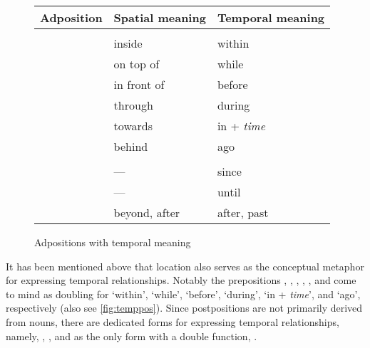 \begin{figure}[tp]\centering
\caption{Adpositions with temporal meaning}
\begin{tabu} to \linewidth {X X X}
\tableheaderfont\toprule
Adposition
	& Spatial meaning
	& Temporal meaning
	\\

\toprule

\tablesubheaderfont{} \\

\midrule

	& inside
	& within
	\\

	& on top of
	& while
	\\

	& in front of
	& before
	\\

	& through
	& during
	\\

	& towards
	& in + \textit{time}
	\\

	& behind
	& ago
	\\

\midrule

\tablesubheaderfont{} \\

\midrule

	& ---
	& since
	\\

	& ---
	& until
	\\

	& beyond, after
	& after, past
	\\

\bottomrule
\end{tabu}

\label{fig:temppos}
\end{figure}

It has been mentioned above that location also serves as the conceptual 
metaphor for expressing temporal relationships. Notably the prepositions 
, , , , , 
and  come to mind as doubling for `within', `while', 
`before', `during', `in + \emph{time}', and `ago', respectively (also see 
\autoref{fig:temppos}). Since postpositions are not primarily derived from 
nouns, there are dedicated forms for expressing temporal relationships, namely, 
, 
, and as the only form with a double function, 
.

